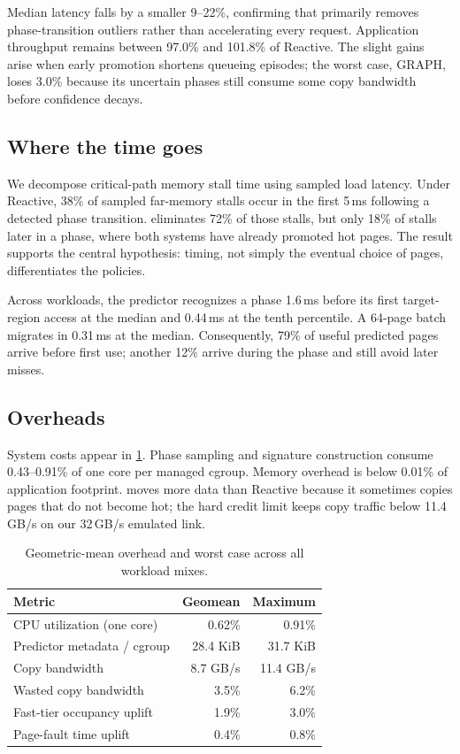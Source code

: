 Median latency falls by a smaller 9--22\%, confirming that \system primarily
removes phase-transition outliers rather than accelerating every request.
Application throughput remains between 97.0\% and 101.8\% of Reactive.  The
slight gains arise when early promotion shortens queueing episodes; the worst
case, GRAPH, loses 3.0\% because its uncertain phases still consume some copy
bandwidth before confidence decays.

\subsection{Where the time goes}

We decompose critical-path memory stall time using sampled load latency.  Under
Reactive, 38\% of sampled far-memory stalls occur in the first 5\,ms following
a detected phase transition.  \system eliminates 72\% of those stalls, but only
18\% of stalls later in a phase, where both systems have already promoted hot
pages.  The result supports the central hypothesis: timing, not simply the
eventual choice of pages, differentiates the policies.

Across workloads, the predictor recognizes a phase 1.6\,ms before its first
target-region access at the median and 0.44\,ms at the tenth percentile.  A
64-page batch migrates in 0.31\,ms at the median.  Consequently, 79\% of useful
predicted pages arrive before first use; another 12\% arrive during the phase
and still avoid later misses.

\subsection{Overheads}

System costs appear in \cref{tab:overheads}.  Phase sampling and signature
construction consume 0.43--0.91\% of one core per managed cgroup.  Memory overhead is below
0.01\% of application footprint.  \system moves more data than Reactive because
it sometimes copies pages that do not become hot; the hard credit limit keeps
copy traffic below 11.4\,GB/s on our 32\,GB/s emulated link.

\begin{table}[t]
  \caption{Geometric-mean overhead and worst case across all workload mixes.}
  \label{tab:overheads}
  \centering
  \small
  \begin{tabular}{@{}lrr@{}}
    \toprule
    Metric & Geomean & Maximum \\
    \midrule
    CPU utilization (one core) & 0.62\% & 0.91\% \\
    Predictor metadata / cgroup & 28.4 KiB & 31.7 KiB \\
    Copy bandwidth              & 8.7 GB/s & 11.4 GB/s \\
    Wasted copy bandwidth       & 3.5\% & 6.2\% \\
    Fast-tier occupancy uplift  & 1.9\% & 3.0\% \\
    Page-fault time uplift      & 0.4\% & 0.8\% \\
    \bottomrule
  \end{tabular}
\end{table}

